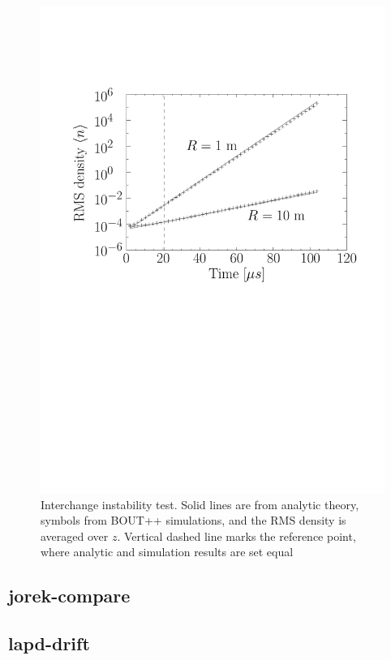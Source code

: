 \documentclass[12pt]{article}
\begin{document}
\begin{figure}[htb!]
\centering
\includegraphics[scale=0.4]{figs/interchange_inst_test.pdf}
\caption{Interchange instability test. Solid lines are from analytic theory, symbols from BOUT++ simulations, and the RMS
density is averaged over $z$. Vertical dashed line marks the reference point, where analytic and simulation results are set equal}
\label{fig:profiles}
\end{figure}

\subsection{jorek-compare}

\subsection{lapd-drift}
\end{document}
